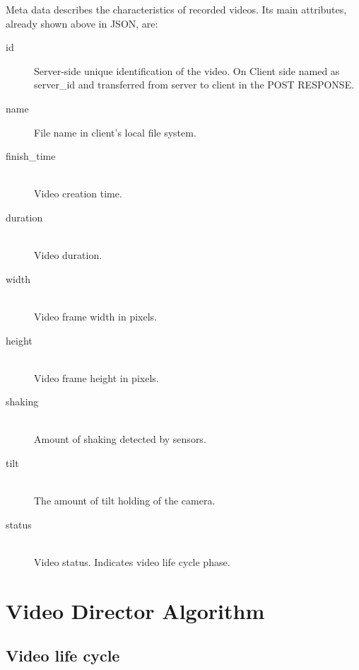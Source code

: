 \documentclass[conference]{IEEEtran}
\begin{document}
Meta data describes the characteristics of recorded videos. Its main attributes, already shown above in JSON, are:

\begin{description}
	\item[id] 
		Server-side unique identification of the video. 
		On Client side named as server\_id and transferred from server to client in the POST RESPONSE.
		
	\item[name]
		File name in client's local file system.
		
	\item[finish\_time]\hfill\\
		Video creation time.
		
	\item[duration]\hfill\\
		Video duration.
		
	\item[width]\hfill\\
		Video frame width in pixels.

	\item[height]\hfill\\
		Video frame height in pixels.		
	
	\item[shaking]\hfill\\
		Amount of shaking detected by sensors.

	\item[tilt]\hfill\\
		The amount of tilt holding of the camera.
	
	\item[status]\hfill\\
		Video status. Indicates video life cycle phase.

		
\end{description}

\section{Video Director Algorithm}

\subsection{Video life cycle}
\end{document}
